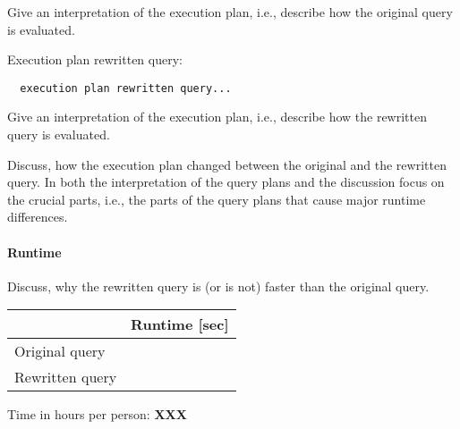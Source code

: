 \documentclass[11pt]{scrartcl}
\begin{document}
Give an interpretation of the execution plan, i.e., describe how the
original query is evaluated.

Execution plan rewritten query:

\begin{verbatim}
  execution plan rewritten query...
\end{verbatim}

Give an interpretation of the execution plan, i.e., describe how the
rewritten query is evaluated.

Discuss, how the execution plan changed between the original and the
rewritten query. In both the interpretation of the query plans and the
discussion focus on the crucial parts, i.e., the parts of the query
plans that cause major runtime differences.

\paragraph{Runtime} Discuss, why the rewritten query is (or is not)
faster than the original query.


\begin{table}[H]
  \begin{tabular}{l|r}
    & Runtime [sec] \\
   \hline
    Original query & \\
    Rewritten query & \\
  \end{tabular}
\end{table}


  Time in hours per person: {\bf XXX}
\end{document}
